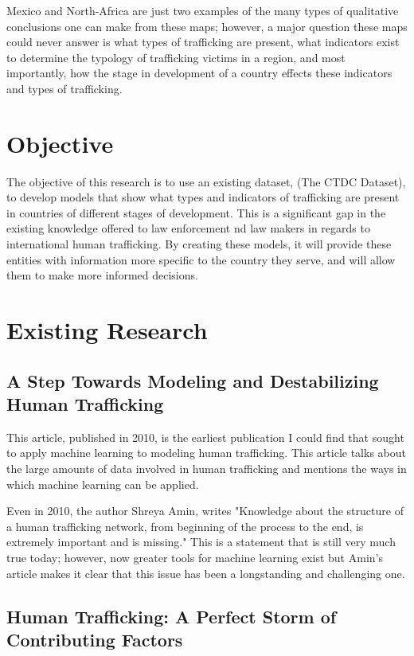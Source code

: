 \documentclass{article} %
\begin{document}
Mexico and North-Africa are just two examples of the many types of qualitative conclusions one can make from these maps; however, a major question these maps could never answer is what types of trafficking are present, what indicators exist to determine the typology of trafficking victims in a region, and most importantly, how the stage in development of a country effects these indicators and types of trafficking.



\section{Objective}

The objective of this research is to use an existing dataset, \cite{CTDC} (The CTDC Dataset), to develop models that show what types and indicators of trafficking are present in countries of different stages of development. This is a significant gap in the existing knowledge offered to law enforcement nd law makers in regards to international human trafficking. By creating these models, it will provide these entities with information more specific to the country they serve, and will allow them to make more informed decisions.

\section{Existing Research}

\subsection*{A Step Towards Modeling and Destabilizing Human Trafficking}

This article, published in 2010, is the earliest publication I could find that sought to apply machine learning to modeling human trafficking. This article talks about the large amounts of data involved in human trafficking and mentions the ways in which machine learning can be applied. 

Even in 2010, the author Shreya Amin, writes "Knowledge about the structure of a human trafficking network, from beginning of the process to the end, is extremely important and is missing." This is a statement that is still very much true today; however, now greater tools for machine learning exist but Amin's article makes it clear that this issue has been a longstanding and challenging one. 
\nocite{firstML}

\subsection*{Human Trafficking: A Perfect Storm of Contributing Factors}
\end{document}
